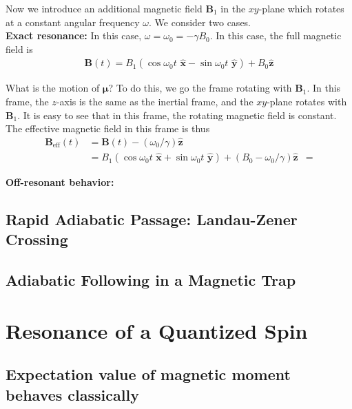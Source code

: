 \documentclass{book}
\theoremstyle{definition}
\begin{document}
Now we introduce an additional magnetic field $\bm{B}_1$ in the $xy$-plane which rotates at a constant angular frequency $\omega$. We consider two cases. \\



\noindent \textbf{Exact resonance:} In this case, $\omega = \omega_0 = -\gamma B_0$. In this case, the full magnetic field is 
\begin{align*}
	\bm{B}(t) = B_1(\cos\omega_0 t \,\, \hat{\bm{x}} -\sin\omega_0 t \,\, \hat{\bm{y}}) + B_0 \hat{\bm{z}}
\end{align*}


What is the motion of $\bm{\mu}$? To do this, we go the frame rotating with $\bm{B}_1$. In this frame, the $z$-axis is the same as the inertial frame, and the $xy$-plane rotates with $\bm{B}_1$. It is easy to see that in this frame, the rotating magnetic field is constant. The effective magnetic field in this frame is thus
\begin{align*}
	\bm{B}_\text{eff}(t) 
	&= \bm{B}(t) - (\omega_0/\gamma) \hat{\bm{z}}\\
	&= B_1(\cos\omega_0 t \,\, \hat{\bm{x}} +\sin\omega_0 t \,\, \hat{\bm{y}}) + (B_0 - \omega_0/\gamma) \hat{\bm{z}}
	&=  
\end{align*}



\noindent \textbf{Off-resonant behavior:} 




\subsection{Rapid Adiabatic Passage: Landau-Zener Crossing}


\subsection{Adiabatic Following in a Magnetic Trap}





\section{Resonance of a Quantized Spin}




\subsection{Expectation value of magnetic moment behaves classically}
\end{document}
